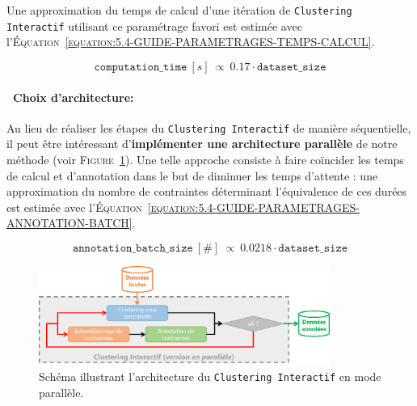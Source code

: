 			Une approximation du temps de calcul d'une itération de \texttt{Clustering Interactif} utilisant ce paramétrage favori est estimée avec l'\textsc{Équation~\ref{equation:5.4-GUIDE-PARAMETRAGES-TEMPS-CALCUL}}.
			
			\begin{equation}
				\label{equation:5.4-GUIDE-PARAMETRAGES-TEMPS-CALCUL}
				\texttt{computation\_time}~[s]~\propto~0.17 \cdot \texttt{dataset\_size}
			\end{equation}
		
		
		\paragraph{\textcolor{colorSilverLakeBlue}{\faCheckSquare} ~Choix d'architecture:}
		
			Au lieu de réaliser les étapes du \texttt{Clustering Interactif} de manière séquentielle, il peut être intéressant d'\textbf{implémenter une architecture parallèle} de notre méthode (voir \textsc{Figure~\ref{figure:5.4-GUIDE-PARAMETRAGES-ARCHITECTURE-PARALLELE}}).
			Une telle approche consiste à faire coïncider les temps de calcul et d'annotation dans le but de diminuer les temps d'attente : une approximation du nombre de contraintes déterminant l'équivalence de ces durées est estimée avec l'\textsc{Équation~\ref{equation:5.4-GUIDE-PARAMETRAGES-ANNOTATION-BATCH}}.
			
			\begin{equation}
				\label{equation:5.4-GUIDE-PARAMETRAGES-ANNOTATION-BATCH}
				\texttt{annotation\_batch\_size}~[\#]~\propto~0.0218 \cdot \texttt{dataset\_size}
			\end{equation}
			
			\begin{figure}[H]
				\centering
				\includegraphics[width=0.85\textwidth]{figures/interactive-clustering-architecture-parallele}
				\caption{
					Schéma illustrant l'architecture du \texttt{Clustering Interactif} en mode parallèle.
				}
				\label{figure:5.4-GUIDE-PARAMETRAGES-ARCHITECTURE-PARALLELE}
			\end{figure}
	
